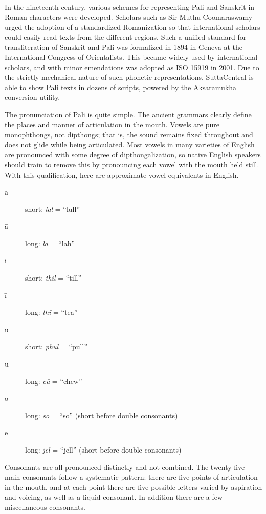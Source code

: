 \documentclass[12pt,openany]{book}%
\begin{document}
In the nineteenth century, various schemes for representing Pali and Sanskrit in Roman characters were developed. Scholars such as Sir Muthu Coomaraswamy urged the adoption of a standardized Romanization so that international scholars could easily read texts from the different regions. Such a unified standard for transliteration of Sanskrit and Pali was formalized in 1894 in Geneva at the International Congress of Orientalists. This became widely used by international scholars, and with minor emendations was adopted as ISO 15919 in 2001. Due to the strictly mechanical nature of such phonetic representations, SuttaCentral is able to show Pali texts in dozens of scripts, powered by the Aksaramukha conversion utility.

The pronunciation of Pali is quite simple. The ancient grammars clearly define the places and manner of articulation in the mouth. Vowels are pure monophthongs, not dipthongs; that is, the sound remains fixed throughout and does not glide while being articulated. Most vowels in many varieties of English are pronounced with some degree of dipthongalization, so native English speakers should train to remove this by pronouncing each vowel with the mouth held still. With this qualification, here are approximate vowel equivalents in English.

\begin{description}%
\item[a] short: \textit{lal} = “lull”%
\item[\textsanskrit{ā}] long: \textit{\textsanskrit{lā}} = “lah”%
\item[i] short: \textit{thil} = “till”%
\item[\textsanskrit{ī}] long: \textit{\textsanskrit{thī}} = “tea”%
\item[u] short: \textit{phul} = “pull”%
\item[\textsanskrit{ū}] long: \textit{\textsanskrit{cū}} = “chew”%
\item[o] long: \textit{so} = “so” (short before double consonants)%
\item[e] long: \textit{jel} = “jell” (short before double consonants)%
\end{description}

Consonants are all pronounced distinctly and not combined. The twenty-five main consonants follow a systematic pattern: there are five points of articulation in the mouth, and at each point there are five possible letters varied by aspiration and voicing, as well as a liquid consonant. In addition there are a few miscellaneous consonants. 
\end{document}
